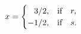 \documentclass{article}
\begin{document}
\begin{gather*}
x=
\begin{cases}
$\phantom{$-$}$3/2, &\mbox{if}\quad r,
\\
-1/2, &\mbox{if}\quad s.
\end{cases}
\end{gather*}
\end{document}
